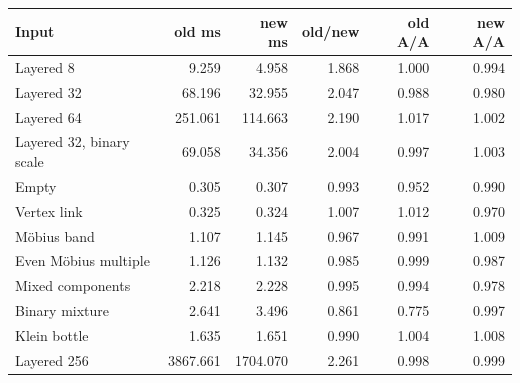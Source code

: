 \begin{center}
\small
\begin{tabular}{lrrrrr}
\toprule
Input & old ms & new ms & old/new & old A/A & new A/A\\
\midrule
Layered 8 & 9.259 & 4.958 & 1.868 & 1.000 & 0.994\\
Layered 32 & 68.196 & 32.955 & 2.047 & 0.988 & 0.980\\
Layered 64 & 251.061 & 114.663 & 2.190 & 1.017 & 1.002\\
Layered 32, binary scale & 69.058 & 34.356 & 2.004 & 0.997 & 1.003\\
Empty & 0.305 & 0.307 & 0.993 & 0.952 & 0.990\\
Vertex link & 0.325 & 0.324 & 1.007 & 1.012 & 0.970\\
M\"obius band & 1.107 & 1.145 & 0.967 & 0.991 & 1.009\\
Even M\"obius multiple & 1.126 & 1.132 & 0.985 & 0.999 & 0.987\\
Mixed components & 2.218 & 2.228 & 0.995 & 0.994 & 0.978\\
Binary mixture & 2.641 & 3.496 & 0.861 & 0.775 & 0.997\\
Klein bottle & 1.635 & 1.651 & 0.990 & 1.004 & 1.008\\
Layered 256 & 3867.661 & 1704.070 & 2.261 & 0.998 & 0.999\\
\bottomrule
\end{tabular}
\end{center}
